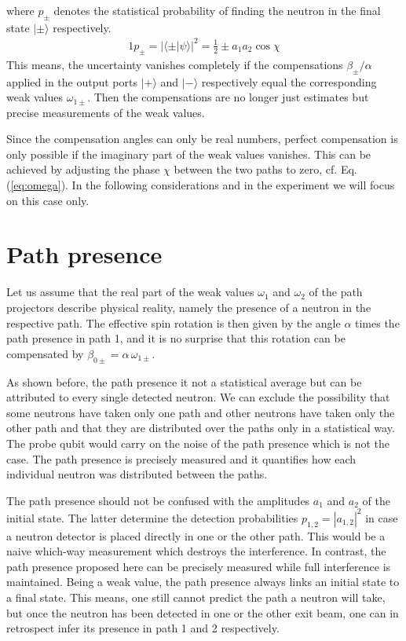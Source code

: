 \documentclass[english,keywords,aps,twocolumn]{revtex4-1}
\begin{document}
where $p_\pm$ denotes the statistical probability of finding the neutron in the final state $|\pm\rangle$ respectively.
\begin{alignat}{1}
p_\pm=|\langle \pm | \psi\rangle|^2=\frac 1 2 \pm a_1 a_2 \cos\chi 
\end{alignat}
This means, the uncertainty vanishes completely if the compensations $\beta_{\pm}/\alpha$ applied in the output ports $|+\rangle$ and $|-\rangle$ respectively equal the corresponding weak values $\omega_{1\pm}$. Then the compensations are no longer just estimates but precise measurements of the weak values. 

Since the compensation angles can only be real numbers, perfect compensation is only possible if the imaginary part of the weak values vanishes. This can be achieved by adjusting the phase $\chi$ between the two paths to zero, cf. Eq. (\ref{eq:omega}). In the following considerations and in the experiment we will focus on this case only. 


\section{Path presence}

Let us assume that the real part of the weak values $\omega_{1}$ and $\omega_{2}$ of the path projectors describe physical reality, namely the presence of a neutron in the respective path. The effective spin rotation is then given by the angle $\alpha$ times the path presence in path 1, and it is no surprise that this rotation can be compensated by $\beta_{0\pm} = \alpha \, \omega_{1\pm}$. 

As shown before, the path presence it not a statistical average but can be attributed to every single detected neutron. We can exclude the possibility that some neutrons have taken only one path and other neutrons have taken only the other path and that they are distributed over the paths only in a statistical way. The probe qubit would carry on the noise of the path presence which is not the case. The path presence is precisely measured and it quantifies how each individual neutron was distributed between the paths.

The path presence should not be confused with the amplitudes $a_1$ and $a_2$ of the initial state. The latter determine the detection probabilities $p_{1,2}=|a_{1,2}|^2$ in case a neutron detector is placed directly in one or the other path. This would be a naive which-way measurement which destroys the interference. 
In contrast, the path presence proposed here can be precisely measured while full interference is maintained. Being a weak value, the path presence always links an initial state to a final state. This means, one still cannot predict the path a neutron will take, but once the neutron has been detected in one or the other exit beam, one can in retrospect infer its presence in path 1 and 2 respectively. 
\end{document}
